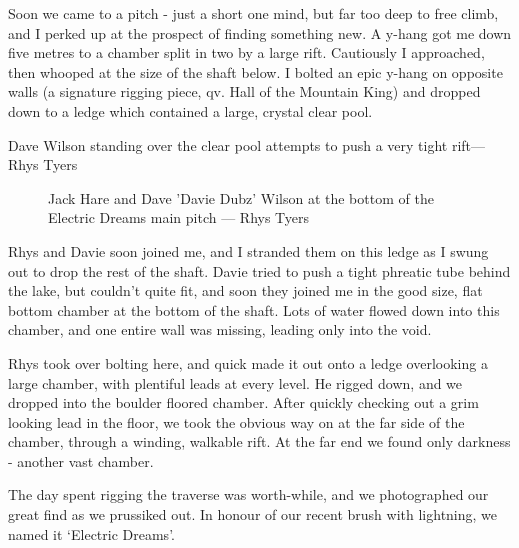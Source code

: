 Soon we came to a pitch - just a short one mind, but far too deep to free climb, and I perked up at the prospect of finding something new. A y-hang got me down five metres to a chamber split in two by a large rift. Cautiously I approached, then whooped at the size of the shaft below. I bolted an epic y-hang on opposite walls (a signature rigging piece, qv. Hall of the Mountain King) and dropped down to a ledge which contained a large, crystal clear pool.

\begin{marginfigure}
\checkoddpage \ifoddpage \forcerectofloat \else \forceversofloat \fi
\centering
{}
 \caption{Dave Wilson standing over the clear pool attempts to push a very tight rift--- Rhys Tyers}\label{Crystal pool}
\end{marginfigure}

\begin{figure}[t!]
\checkoddpage \ifoddpage \forcerectofloat \else \forceversofloat \fi
\centering
        \caption{Jack Hare and Dave 'Davie Dubz' Wilson at the bottom of the Electric Dreams main pitch --- Rhys Tyers} \label{Electric dreams}
\end{figure}

Rhys and Davie soon joined me, and I stranded them on this ledge as I swung out to drop the rest of the shaft. Davie tried to push a tight phreatic tube behind the lake, but couldn’t quite fit, and soon they joined me in the good size, flat bottom chamber at the bottom of the shaft. Lots of water flowed down into this chamber, and one entire wall was missing, leading only into the void.

Rhys took over bolting here, and quick made it out onto a ledge overlooking a large chamber, with plentiful leads at every level. He rigged down, and we dropped into the boulder floored chamber. After quickly checking out a grim looking lead in the floor, we took the obvious way on at the far side of the chamber, through a winding, walkable rift. At the far end we found only darkness - another vast chamber.

The day spent rigging the traverse was worth-while, and we photographed our great find as we prussiked out. In honour of our recent brush with lightning, we named it ‘Electric Dreams’.

